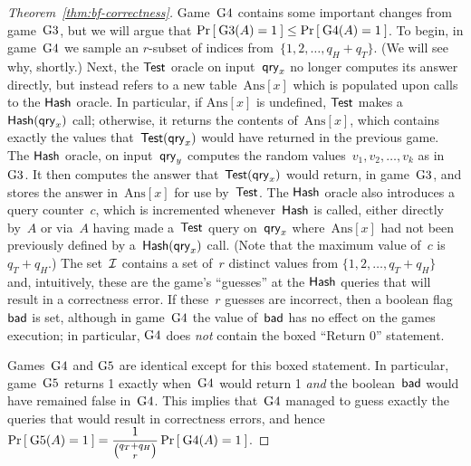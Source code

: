 \begin{proof}[Theorem~\ref{thm:bf-correctness}]
Game~$\text{G4}$ contains some important changes from game~$\text{G3}$,
but we will argue that $\Pr\left[\: \text{G3}(A) = 1 \:\right] \leq \Pr\left[\: \text{G4}(A)
  = 1 \:\right]$.  To begin, in game~$\text{G4}$ we sample an $r$-subset of
indices from~$\{1,2,\ldots,q_H+q_T\}$.  (We will see why, shortly.)
Next, the $\mathsf{Test}$ oracle on input~$\mathsf{qry}_x$ no longer computes
its answer directly, but instead refers to a new
table~$\mathrm{Ans}[x]$ which is populated upon calls to the
$\mathsf{Hash}$ oracle.  In particular, if $\mathrm{Ans}[x]$ is
undefined, $\mathsf{Test}$ makes a $\mathsf{Hash}(\mathsf{qry}_x)$ call;
otherwise, it returns the contents of~$\mathrm{Ans}[x]$, which
contains exactly the values that~$\mathsf{Test}(\mathsf{qry}_x)$ would have
returned in the previous game.  The $\mathsf{Hash}$ oracle, on
input~$\mathsf{qry}_y$ computes the random values~$v_1,v_2,\ldots,v_k$ as in
$\text{G3}$.  
It then computes the answer that~$\mathsf{Test}(\mathsf{qry}_x)$ would return, in game~$\text{G3}$, and stores the answer in~$\mathrm{Ans}[x]$ for use by~$\mathsf{Test}$.  The $\mathsf{Hash}$ oracle also introduces a query counter~$c$, which is incremented whenever~$\mathsf{Hash}$ is called, either directly by~$A$ or via~$A$ having made a~$\mathsf{Test}$ query on~$\mathsf{qry}_x$ where~$\mathrm{Ans}[x]$ had not been previously defined by a~$\mathsf{Hash}(\mathsf{qry}_x)$ call.    (Note that the maximum value of~$c$ is $q_T + q_H$.)  The set~${\cal I}$ contains a set of~$r$ distinct values from $\{1,2,\ldots,q_T+q_H\}$ and, intuitively, these are the game's ``guesses'' at the $\mathsf{Hash}$ queries that will result in a correctness error.  If these~$r$ guesses are incorrect, then a boolean flag~$\mathsf{bad}$ is set, although in game~$\text{G4}$ the value of~$\mathsf{bad}$ has no effect on the games execution; in particular, $\text{G4}$ does \emph{not} contain the boxed ``Return 0'' statement.

Games~$\text{G4}$ and $\text{G5}$ are identical except for this boxed statement.  In particular, game~$\text{G5}$ returns 1 exactly when~$\text{G4}$ would return 1 \emph{and} the boolean~$\mathsf{bad}$ would have remained false in~$\text{G4}$.   This implies that~$\text{G4}$ managed to guess exactly the queries that would result in correctness errors, and hence
$\Pr\left[\: \text{G5}(A)=1 \:\right] = \dfrac{1}{\binom{q_T + q_H}{r}}\Pr\left[\: \text{G4}(A)=1 \:\right]$.


\end{proof}

